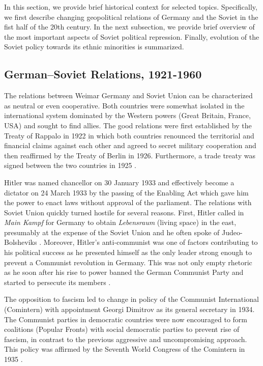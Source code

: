 In this section, we provide brief historical context for selected topics. Specifically, we first describe  changing geopolitical relations of Germany and the Soviet in the fist half of the 20th century. In the next subsection, we provide brief overview of the most important aspects of Soviet political repression. Finally, evolution of the Soviet policy towards its ethnic minorities is summarized.   
\subsection{German–Soviet Relations, 1921-1960} \label{subsec:relations}
The relations between Weimar Germany and Soviet Union can be characterized as neutral or even cooperative. Both countries were somewhat isolated in the international system dominated by the Western powers (Great Britain, France, USA) and sought to find allies. The good relations were first established by the Treaty of Rappalo in 1922 in which both countries renounced the territorial and financial claims against each other and agreed to secret military cooperation \citep{gatzke_russo-german_1958} and then reaffirmed by the Treaty of Berlin in 1926. Furthermore, a trade treaty was signed between the two countries in 1925 \citep{morgan_political_1963}.

Hitler was named chancellor on 30 January 1933 and effectively become a dictator on 24 March 1933 by the passing of the Enabling Act which gave him the power to enact laws without  approval of the parliament. 
The relations with Soviet Union quickly turned hostile for several reasons.  First, Hitler called in \emph{Main Kampf} for Germany to obtain \emph{Lebensraum} (living space) in the east, presumably at the expense of the Soviet Union and he often spoke of Judeo-Bolsheviks \citep[p. 6]{haslam_soviet_1984}. Moreover, Hitler's anti-communist was one of factors contributing to his political success as he presented himself as the only leader strong enough to  prevent a Communist revolution in Germany. This was not only empty rhetoric as he soon after his rise to power banned the German Communist Party and started to persecute its members \citep[chapter 5]{evans_coming_2004}. 

The opposition to fascism led to change in policy of the Communist International (Comintern)  with appointment Georgi Dimitrov as  its general secretary in 1934. The Communist parties in democratic countries were now encouraged to form coalitions (Popular Fronts) with social democratic parties to prevent rise of fascism, in contrast to the previous aggressive and uncompromising approach. This policy was affirmed by the Seventh World Congress of the Comintern in 1935 \citep{haslam_comintern_1979}.

